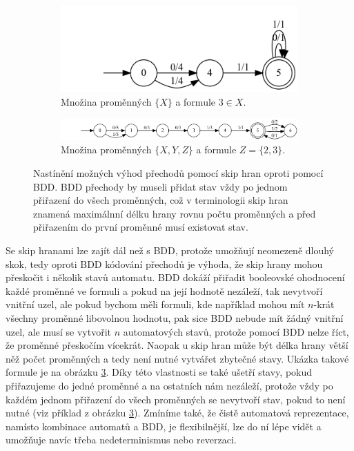 \begin{figure}
    \centering
    \begin{subfigure}{.3\textwidth}
        \centering
        \includegraphics[scale=0.3]{obrazky-figures/skip_adv_in.png}
        \caption{Množina proměnných $\{ X \}$ a formule $3 \in X$.}
        \label{skip_adv_in}
    \end{subfigure}%
    \hfil
    \begin{subfigure}{.65\textwidth}
        \centering
        \includegraphics[scale=0.3]{obrazky-figures/skip_adv_set.png}
        \caption{Množina proměnných $\{ X,Y,Z \}$ a formule $Z=\{ 2,3 \}$.}
        \label{skip_adv_set}
    \end{subfigure}
    \caption{Nastínění možných výhod přechodů pomocí skip hran oproti pomocí BDD. BDD přechody by museli přidat stav vždy po jednom přiřazení do všech proměnných, což v terminologii skip hran znamená maximálnní délku hrany rovnu počtu proměnných a před přiřazením do první proměnné musí existovat stav.}
    \label{skip_adv}
\end{figure}

Se skip hranami lze zajít dál než s BDD, protože umožňují neomezeně dlouhý skok, tedy oproti BDD kódování přechodů je výhoda, že skip hrany mohou přeskočit i několik stavů automatu. BDD dokáží přiřadit booleovské ohodnocení každé proměnné ve formuli a pokud na její hodnotě nezáleží, tak nevytvoří vnitřní uzel, ale pokud bychom měli formuli, kde například mohou mít $n$-krát všechny proměnné libovolnou hodnotu, pak sice BDD nebude mít žádný vnitřní uzel, ale musí se vytvořit $n$ automatových stavů, protože pomocí BDD nelze říct, že proměnné přeskočím vícekrát. Naopak u skip hran může být délka hrany větší něž počet proměnných a tedy není nutné vytvářet zbytečné stavy. Ukázka takové formule je na obrázku \ref{skip_adv}. Díky této vlastnosti se také ušetří stavy, pokud přiřazujeme do jedné proměnné a na ostatních nám nezáleží, protože vždy po každém jednom přiřazení do všech proměnných se nevytvoří stav, pokud to není nutné (viz příklad z obrázku \ref{skip_adv}). Zmíníme také, že čistě automatová reprezentace, namísto kombinace automatů a BDD, je flexibilnější, lze do ní lépe vidět a umožňuje navíc třeba nedeterminismus nebo reverzaci.

